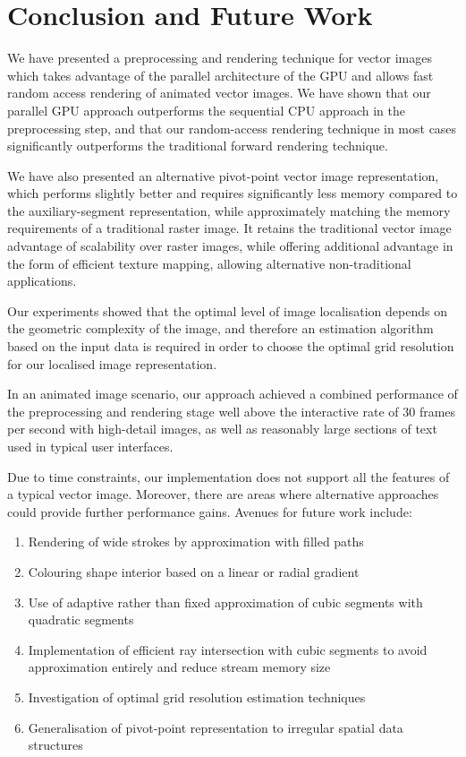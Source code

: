 \documentclass[11pt,a4paper,twoside]{article}
\begin{document}
\section {Conclusion and Future Work}

We have presented a preprocessing and rendering technique for vector images which takes advantage of the parallel architecture of the GPU and allows fast random access rendering of animated vector images. We have shown that our parallel GPU approach outperforms the sequential CPU approach in the preprocessing step, and that our random-access rendering technique in most cases significantly outperforms the traditional forward rendering technique.

We have also presented an alternative pivot-point vector image representation, which performs slightly better and requires significantly less memory compared to the auxiliary-segment representation, while approximately matching the memory requirements of a traditional raster image. It retains the traditional vector image advantage of scalability over raster images, while offering additional advantage in the form of efficient texture mapping, allowing alternative non-traditional applications.

Our experiments showed that the optimal level of image localisation depends on the geometric complexity of the image, and therefore an estimation algorithm based on the input data is required in order to choose the optimal grid resolution for our localised image representation.

In an animated image scenario, our approach achieved a combined performance of the preprocessing and rendering stage well above the interactive rate of 30 frames per second with high-detail images, as well as reasonably large sections of text used in typical user interfaces.

Due to time constraints, our implementation does not support all the features of a typical vector image. Moreover, there are areas where alternative approaches could provide further performance gains. Avenues for future work include:

\begin {enumerate}
\item
Rendering of wide strokes by approximation with filled paths
\item
Colouring shape interior based on a linear or radial gradient
\item
Use of adaptive rather than fixed approximation of cubic segments with quadratic segments
\item
Implementation of efficient ray intersection with cubic segments to avoid approximation entirely and reduce stream memory size
\item
Investigation of optimal grid resolution estimation techniques
\item
Generalisation of pivot-point representation to irregular spatial data structures
\end {enumerate}

\newpage


\end{document}
